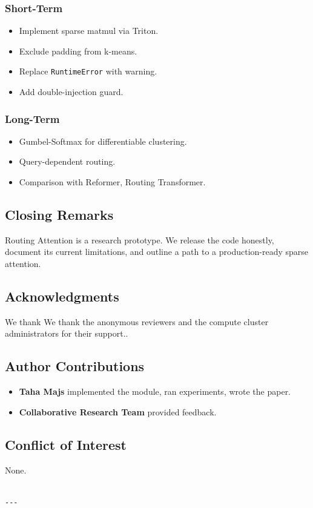 \subsubsection{Short-Term}

\begin{itemize}
\item Implement sparse matmul via Triton.
\item Exclude padding from k-means.
\item Replace \texttt{RuntimeError} with warning.
\item Add double-injection guard.

\end{itemize}
\subsubsection{Long-Term}

\begin{itemize}
\item Gumbel-Softmax for differentiable clustering.
\item Query-dependent routing.
\item Comparison with Reformer, Routing Transformer.

\end{itemize}
\subsection{Closing Remarks}

Routing Attention is a research prototype. We release the code honestly, 
document its current limitations, and outline a path to a production-ready 
sparse attention.

\subsection{Acknowledgments}

We thank We thank the anonymous reviewers and the compute cluster administrators for their support..

\subsection{Author Contributions}

\begin{itemize}
\item \textbf{Taha Majs} implemented the module, ran experiments, wrote the paper.
\item \textbf{Collaborative Research Team} provided feedback.

\end{itemize}
\subsection{Conflict of Interest}

None.
\begin{lstlisting}

---
\end{lstlisting}